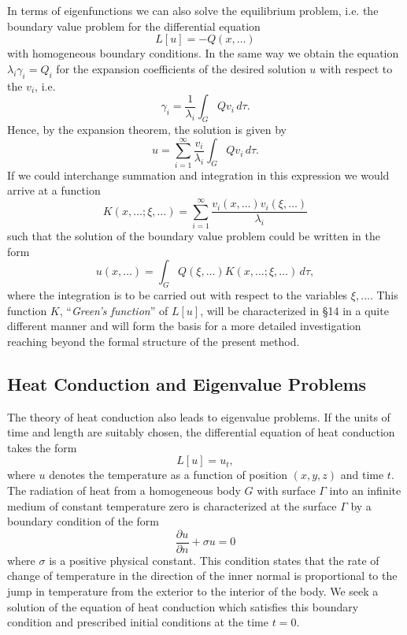 In terms of eigenfunctions we can also solve the equilibrium problem, i.e. the boundary value problem for the differential equation
\[
L[u]=-Q(x,\ldots)
\]
with homogeneous boundary conditions. In the same way we obtain the equation $\lambda_i\gamma_i=Q_i$ for the expansion coefficients of the desired solution $u$ with respect to the $v_i$, i.e.
\[
\gamma_i=\frac1{\lambda_i}\int_GQv_i\,d\tau.
\]
Hence, by the expansion theorem, the solution is given by
\[
u=\sum_{i=1}^{\infty}\frac{v_i}{\lambda_i}\int_GQv_i\,d\tau.
\]
If we could interchange summation and integration in this expression we would arrive at a function
\[
K(x,\ldots;\xi,\ldots)=\sum_{i=1}^{\infty}\frac{v_i(x,\ldots)v_i(\xi,\ldots)}{\lambda_i}
\]
such that the solution of the boundary value problem could be written in the form
\[
u(x,\ldots)=\int_GQ(\xi,\ldots)K(x,\ldots;\xi,\ldots)\,d\tau,
\]
where the integration is to be carried out with respect to the variables $\xi,\ldots$. This function $K$, ``\emph{Green's function}'' of $L[u]$, will be characterized in \S14 in a quite different manner and will form the basis for a more detailed investigation reaching beyond the formal structure of the present method.

\subsection{Heat Conduction and Eigenvalue Problems}
The theory of heat conduction also leads to eigenvalue problems. If the units of time and length are suitably chosen, the differential equation of heat conduction takes the form
\[
L[u]=u_t,
\]
where $u$ denotes the temperature as a function of position $(x,y,z)$ and time $t$. The radiation of heat from a homogeneous body $G$ with surface $\Gamma$ into an infinite medium of constant temperature zero is characterized at the surface $\Gamma$ by a boundary condition of the form
\[
\frac{\partial u}{\partial n}+\sigma u=0
\]
where $\sigma$ is a positive physical constant. This condition states that the rate of change of temperature in the direction of the inner normal is proportional to the jump in temperature from the exterior to the interior of the body. We seek a solution of the equation of heat conduction which satisfies this boundary condition and prescribed initial conditions at the time $t=0$.

